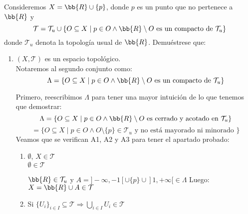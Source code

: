 \documentclass[12pt]{article}
\newcounter{ejercicio}[section] %
\newcounter{ejercicio}
\begin{document}
    \begin{ejercicio}[3 puntos]
        Consideremos $X = \bb{R} \cup \{p\}$, donde $p$ es un punto que no pertenece a $\bb{R}$ y 
        $$\mathcal{T} = \mathcal{T}_u \cup \{O \subseteq X \mid p \in O \land \bb{R}\setminus O \mbox{ es un compacto de } \mathcal{T}_u\}$$
        donde $\mathcal{T}_u$ denota la topología usual de $\bb{R}$. Demuéstrese que:
        \begin{enumerate}[label=(\alph*)]
            \item $(X,\mathcal{T})$ es un espacio topológico.\\

                \noindent
                Notaremos al segundo conjunto como:
                $$\Lambda = \{O \subseteq X \mid p \in O \land \bb{R}\setminus O \mbox{ es un compacto de } \mathcal{T}_u\} $$

                \noindent
                Primero, reescribimos $\Lambda$ para tener una mayor intuición de lo que tenemos que demostrar:
                $$\Lambda = \{O \subseteq X \mid p \in O \land \bb{R}\setminus O \mbox{ es cerrado y acotado en } \mathcal{T}_u\} $$
                $$ = \{ O \subseteq X \mid p \in O \land O \setminus \{p\} \in \mathcal{T}_u \mbox{ y no está mayorado ni minorado }\}$$
                Veamos que se verifican A1, A2 y A3 para tener el apartado probado:

                \begin{enumerate}
                    \item[A1)] $\emptyset$, $X \in \mathcal{T}$\\
                        
                        \noindent
                        $\emptyset \in \mathcal{T}$

                        \noindent
                        $\bb{R} \in \mathcal{T}_u$ y $A = ]-\infty, -1[ \cup \{p\} \cup ]1, +\infty[ \in \Lambda$\newline
                        Luego: $X = \bb{R} \cup A \in \mathcal{T}$
                    \item[A2)] Si $\{U_i\}_{i \in I} \subseteq \mathcal{T} \Rightarrow \displaystyle \bigcup_{i \in I} U_i \in \mathcal{T}$\\


\end{enumerate}
\end{enumerate}
\end{ejercicio}
\end{document}
